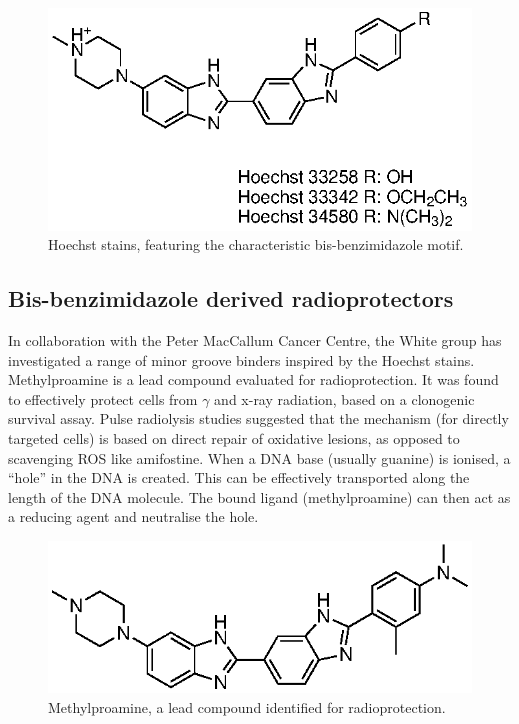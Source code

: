 \begin{refsection}
\begin{figure}
\centering
\includegraphics[scale=0.74]{Figures/hoechst.eps}
\caption{Hoechst stains, featuring the characteristic bis-benzimidazole motif.}\label{fig:hoechst}
\end{figure}

\subsection{Bis-benzimidazole derived radioprotectors}

In collaboration with the Peter MacCallum Cancer Centre, the White group has investigated a range of minor groove binders inspired by the Hoechst stains.
Methylproamine is a lead compound evaluated for radioprotection.
It was found to effectively protect cells from $\gamma$ and x-ray radiation, based on a clonogenic survival assay.
Pulse radiolysis studies suggested that the mechanism (for directly targeted cells) is based on direct repair of oxidative lesions, as opposed to scavenging ROS like amifostine.
When a DNA base (usually guanine) is ionised, a ``hole'' in the DNA is created.
This can be effectively transported along the length of the DNA molecule\autocite{Giese2002}.
The bound ligand (methylproamine) can then act as a reducing agent and neutralise the hole.

\begin{figure}
\includegraphics[scale=0.74]{Figures/methylproamine.eps}
\caption{Methylproamine, a lead compound identified for radioprotection.}\label{fig:methylproamine}
\end{figure}


\end{refsection}
